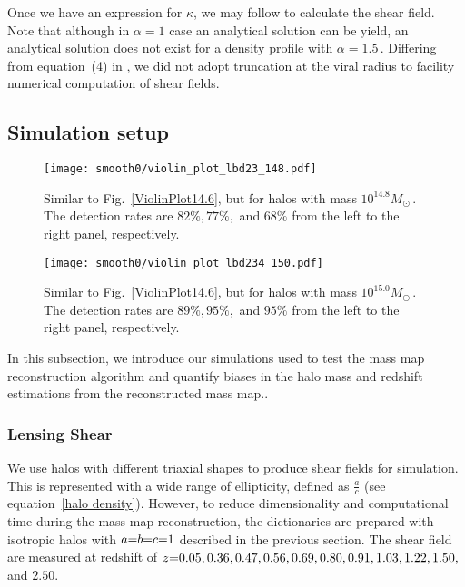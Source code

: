 \documentclass[twocolumn, usenames, dvipsnames]{aastex63}
\begin{document}
Once we have an expression for $\kappa$, we may follow \citet{halo_keeton2001a}
to calculate the shear field. Note that although in $\alpha=1$ case an
analytical solution can be yield, an analytical solution does not exist for a
density profile with $\alpha=1.5$\,. Differing from equation~(4) in
\citet{massmap_Li2021}, we did not adopt truncation at the viral radius to
facility numerical computation of shear fields.

\subsection{Simulation setup}
\label{sec:oneHalo_sim}

\begin{figure*}[!ht]
\centering
\texttt{[image: smooth0/violin\_plot\_lbd23\_148.pdf]}
\caption{
    Similar to Fig.~\ref{ViolinPlot14.6}, but for halos with mass $10^{14.8}
    M_{\odot}$\,. The detection rates are $82\%, 77\%,$ and $68\%$ from the
    left to the right panel, respectively.
    }
    \label{ViolinPlot14.8}
\end{figure*}
\begin{figure*}[!ht]
\begin{center}
    \texttt{[image: smooth0/violin\_plot\_lbd234\_150.pdf]}
\end{center}
\caption{
    Similar to Fig.~\ref{ViolinPlot14.6}, but for halos with mass $10^{15.0}
    M_{\odot}$\,. The detection rates are $89\%, 95\%,$ and $95\%$ from the
    left to the right panel, respectively.
    }
    \label{ViolinPlot15.0}
\end{figure*}

In this subsection, we introduce our simulations used to test the mass map
reconstruction algorithm and quantify biases in the halo mass and redshift
estimations from the reconstructed mass map..

\subsubsection{Lensing Shear}
\label{sec:numerical_dictionary}

We use halos with different triaxial shapes to produce shear fields for
simulation. This is represented with a wide range of ellipticity, defined as
$\frac{a}{c}$ (see equation~\ref{halo density}). However, to reduce
dimensionality and computational time during the mass map reconstruction, the
dictionaries are prepared with isotropic halos with $a\kern-0.28em
=\kern-0.28em b \kern-0.28em =\kern-0.28em c \kern-0.28em =\kern-0.28em 1$
described in the previous section. The shear field are measured at redshift of
$z\kern-0.28em =\kern-0.28em 0.05, 0.36, 0.47, 0.56, 0.69, 0.80, 0.91, 1.03,
1.22, 1.50,$ and $2.50$.
\end{document}

